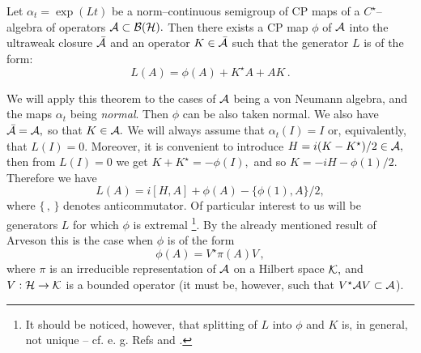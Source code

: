 \documentclass[12pt]{article}
\def\be{\begin{equation}} \def\ee{\end{equation}}
\begin{document}
\begin{theorem}
Let $\alpha_t = \exp  (L t)$ be a
norm--continuous semigroup of CP maps of a
$C^{\star }$-- algebra of operators ${\cal A}\subset {\cal B} ({\cal
H}) . $ Then there exists a CP map $\phi$
of ${\cal A}$ into the ultraweak closure ${\bar {\cal A}}$
and an operator $K\in {\bar {\cal A}}$ such that the
generator $L$ is of the form: 
\be
L (A) = \phi  (A) + K^{\star }A + AK \,  . 
\ee
\end{theorem}
We will apply this theorem to the cases of ${\cal A}$ being a von Neumann
algebra,  and the maps $\alpha_t$ being {\em normal}.  Then $\phi$ can be
also taken normal.  We also have ${\bar {{\cal A}}} = {\cal A} , $
so that $K\in {\cal A} . $ We will always assume that $\alpha_t  (I) = I $ or, 
equivalently,  that $L (I)=0 . $  Moreover,  it is convenient to introduce $
H=i (K-K^{\star })/2 \in {\cal A}, $ then from $L (I)=0$ we get $K+K^{\star
}=-\phi  (I) , $ and so $K=-iH-\phi  (1)/2 . $ Therefore we have \be
L (A) = i\left[H, A\right]+\phi  (A) -\{ \phi  (1) , A\}/2 ,  \ee         
where $\{\,  ,  \,  \}$ denotes anticommutator.  Of particular interest to us
will be generators $L$ for which $\phi$ is extremal \footnote{It should 
be noticed, 
however,  that splitting of $L$ into $\phi$ and $K$ is,  in general,  not
unique -- cf.  e. g.  Refs \cite{dav} and \cite[Ch. III. 29--30]{par}. }.  
By the already
mentioned result of Arveson \cite{arv} this is the case when $\phi$ is
of the form \be
\phi  (A)=V^{\star }\pi  (A) V \,  ,  \ee   
where $\pi$ is an irreducible representation of ${\cal A}$ on a Hilbert
space ${\cal K} , $ and $V: {\cal H}\rightarrow {\cal K}$ is a bounded
operator  (it must be,  however,  such that $V^{\star}{\cal A} V \subset 
{\cal A
}$).  
\end{document}
